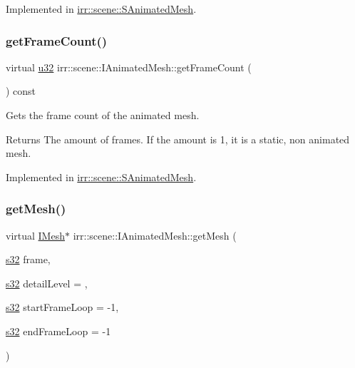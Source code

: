 Implemented in \hyperlink{structirr_1_1scene_1_1SAnimatedMesh_aa6b6302dad72761e22ba10cc4486b4c8}{irr\+::scene\+::\+S\+Animated\+Mesh}.

\mbox{\label{classirr_1_1scene_1_1IAnimatedMesh_a2ec99aba081e9f37802e8ea9cd65629b}} 
\subsubsection{\texorpdfstring{get\+Frame\+Count()}{getFrameCount()}}
{\footnotesize\ttfamily virtual \hyperlink{namespaceirr_a0416a53257075833e7002efd0a18e804}{u32} irr\+::scene\+::\+I\+Animated\+Mesh\+::get\+Frame\+Count (\begin{DoxyParamCaption}{ }\end{DoxyParamCaption}) const\hspace{0.3cm}{\ttfamily [pure virtual]}}



Gets the frame count of the animated mesh. 

\begin{DoxyReturn}{Returns}
The amount of frames. If the amount is 1, it is a static, non animated mesh. 
\end{DoxyReturn}


Implemented in \hyperlink{structirr_1_1scene_1_1SAnimatedMesh_a58d8940d3002792194c74e209a5f2949}{irr\+::scene\+::\+S\+Animated\+Mesh}.

\mbox{\label{classirr_1_1scene_1_1IAnimatedMesh_adccb39fee83bed36a464cf7b96f3a0ca}} 
\subsubsection{\texorpdfstring{get\+Mesh()}{getMesh()}}
{\footnotesize\ttfamily virtual \hyperlink{classirr_1_1scene_1_1IMesh}{I\+Mesh}$\ast$ irr\+::scene\+::\+I\+Animated\+Mesh\+::get\+Mesh (\begin{DoxyParamCaption}\item[{\hyperlink{namespaceirr_ac66849b7a6ed16e30ebede579f9b47c6}{s32}}]{frame,  }\item[{\hyperlink{namespaceirr_ac66849b7a6ed16e30ebede579f9b47c6}{s32}}]{detail\+Level = {},  }\item[{\hyperlink{namespaceirr_ac66849b7a6ed16e30ebede579f9b47c6}{s32}}]{start\+Frame\+Loop = {\ttfamily -\/1},  }\item[{\hyperlink{namespaceirr_ac66849b7a6ed16e30ebede579f9b47c6}{s32}}]{end\+Frame\+Loop = {\ttfamily -\/1} }\end{DoxyParamCaption})\hspace{0.3cm}{\ttfamily [pure virtual]}}



